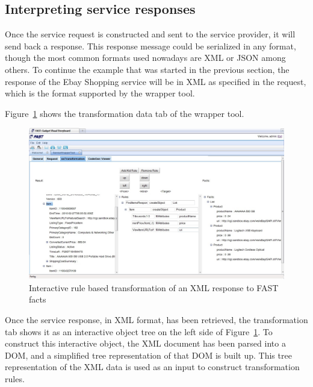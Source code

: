 \documentclass{fast_latex}
\begin{document}

\subsection{Interpreting service responses} %
\label{sub:interpreting_service_responses}

Once the service request is constructed and sent to the service provider, it will send back a response. This response message could be serialized in any format, though the most common formats used nowadays are XML or JSON among others. To continue the example that was started in the previous section, the response of the Ebay Shopping service will be in XML as specified in the request, which is the format supported by the wrapper tool.

Figure~\ref{fig:response_service_execution} shows the transformation data tab of the wrapper tool. 

\begin{figure}
  \begin{center}
    \includegraphics[angle=90,width=0.8\linewidth]{images/ServiceWrapperToolGVSWithTransformationRules.jpg}
    \caption{Interactive rule based transformation of an XML response to FAST facts}
    \label{fig:response_service_execution}
  \end{center}
\end{figure}

Once the service response, in XML format, has been retrieved, the transformation tab shows it as an interactive object tree on the left side of Figure~\ref{fig:response_service_execution}. To construct this interactive object, the XML document has been parsed into a DOM, and a simplified tree representation of that DOM is built up. This tree representation of the XML data is used as an input to construct transformation rules.
\end{document}
